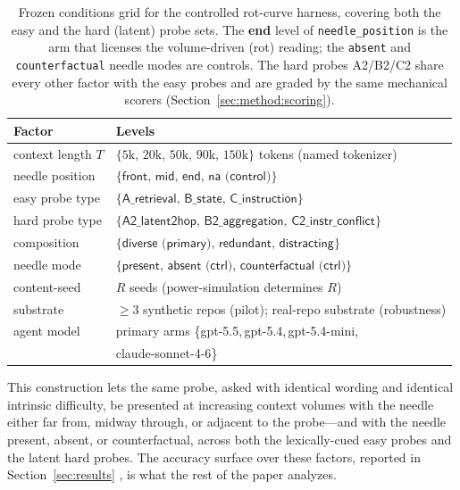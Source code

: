 \documentclass[11pt]{article}
\providecommand{\resultplaceholder}{}
\renewcommand{\resultplaceholder}{}
\begin{document}
\begin{table}[t]
\centering
\caption{Frozen conditions grid for the controlled rot-curve harness, covering both the easy and
the hard (latent) probe sets. The \textbf{end} level of \texttt{needle\_position} is the arm that
licenses the volume-driven (rot) reading; the \texttt{absent} and \texttt{counterfactual} needle
modes are controls. The hard probes A2/B2/C2 share every other factor with the easy probes and are
graded by the same mechanical scorers (Section~\ref{sec:method:scoring}).}
\label{tab:conditions}
\small
\begin{tabular}{@{}ll@{}}
\toprule
\textbf{Factor} & \textbf{Levels} \\
\midrule
context length $T$ & $\{5\mathrm{k},\,20\mathrm{k},\,50\mathrm{k},\,90\mathrm{k},\,150\mathrm{k}\}$ tokens (named tokenizer) \\
needle position & $\{\textsf{front},\,\textsf{mid},\,\textsf{end},\,\textsf{na (control)}\}$ \\
easy probe type & $\{\textsf{A\_retrieval},\,\textsf{B\_state},\,\textsf{C\_instruction}\}$ \\
hard probe type & $\{\textsf{A2\_latent2hop},\,\textsf{B2\_aggregation},\,\textsf{C2\_instr\_conflict}\}$ \\
composition & $\{\textsf{diverse (primary)},\,\textsf{redundant},\,\textsf{distracting}\}$ \\
needle mode & $\{\textsf{present},\,\textsf{absent (ctrl)},\,\textsf{counterfactual (ctrl)}\}$ \\
content-seed & $R$ seeds (power-simulation determines $R$) \\
substrate & $\geq 3$ synthetic repos (pilot); real-repo substrate (robustness) \\
agent model & primary arms \{\textsf{gpt-5.5},\,\textsf{gpt-5.4},\,\textsf{gpt-5.4-mini}, \\
            & \textsf{claude-sonnet-4-6}\} \\
\bottomrule
\end{tabular}
\end{table}

This construction lets the same probe, asked with identical wording and identical
intrinsic difficulty, be presented at increasing context volumes with the needle either far from,
midway through, or adjacent to the probe---and with the needle present, absent, or counterfactual,
across both the lexically-cued easy probes and the latent hard probes. The accuracy surface over
these factors, reported in Section~\ref{sec:results} \resultplaceholder, is what the rest of the
paper analyzes.
\end{document}
